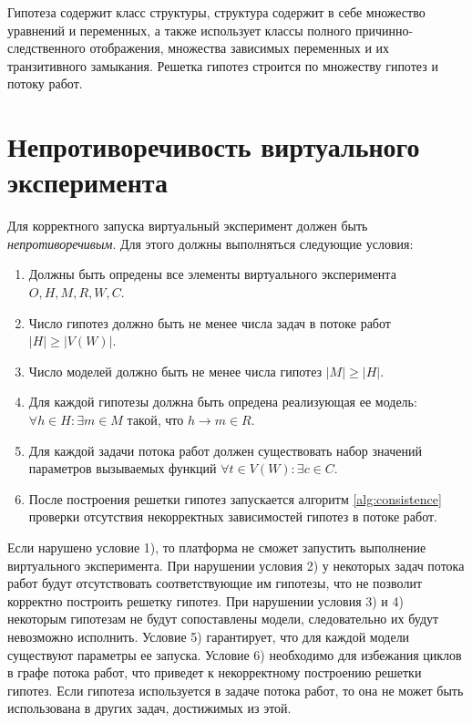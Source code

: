 Гипотеза содержит класс структуры, структура содержит в себе множество уравнений и переменных, а также использует 
классы полного причинно-следственного отображения, множества зависимых переменных и их транзитивного замыкания. 
Решетка гипотез строится по множеству гипотез и потоку работ.



\section{Непротиворечивость виртуального эксперимента}\label{sect2_5}
Для корректного запуска виртуальный эксперимент должен быть \textit{непротиворечивым}. 
Для этого должны выполняться следующие условия:
\begin{enumerate}
    \item Должны быть опредены все элементы виртуального эксперимента $O, H, M, R, W, C$.
    \item Число гипотез должно быть не менее числа задач в потоке работ $|H| \geq |V(W)| $.
    \item Число моделей должно быть не менее числа гипотез $|M| \geq |H|$.
    \item Для каждой гипотезы должна быть опредена реализующая ее модель: $ \forall h \in H: \exists m \in M$ такой, 
            что $h \rightarrow m \in R$.
    
    \item Для каждой задачи потока работ должен существовать набор значений параметров вызываемых функций 
            $ \forall t \in V(W): \exists c \in C$.
    \item После построения решетки гипотез запускается алгоритм \ref{alg:consistence} проверки отсутствия 
            некорректных зависимостей гипотез в потоке работ.
\end{enumerate}

Если нарушено условие 1), то платформа не сможет запустить выполнение виртуального эксперимента.
При нарушении условия 2) у некоторых задач потока работ будут отсутствовать соответствующие им гипотезы, что не 
позволит корректно построить решетку гипотез. При нарушении условия 3) и 4) некоторым гипотезам не будут 
сопоставлены модели, следовательно их будут невозможно исполнить. Условие 5) гарантирует, что для каждой модели 
существуют параметры ее запуска. Условие 6) необходимо для избежания циклов в графе потока работ, что приведет к 
некорректному построению решетки гипотез. Если гипотеза используется в задаче потока работ, то она не может быть 
использована в других задач, достижимых из этой. 

